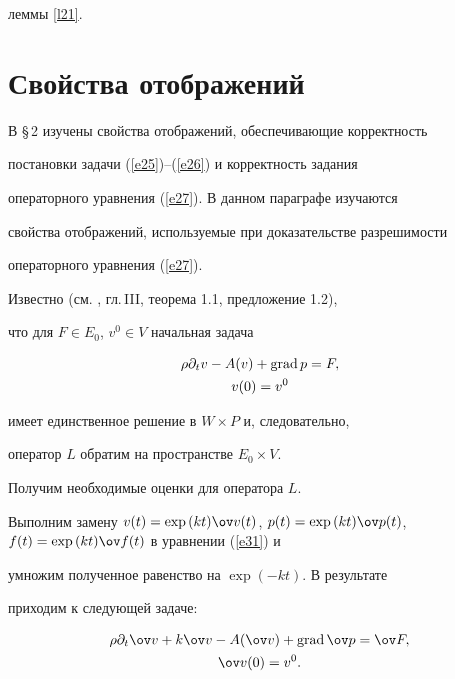 леммы \ref{l21}.








\section{Свойства отображений}





В \S\,2 изучены свойства отображений, обеспечивающие корректность


постановки задачи (\ref{e25})--(\ref{e26}) и корректность задания


операторного уравнения (\ref{e27}). В данном параграфе изучаются


свойства отображений, используемые при доказательстве разрешимости


операторного уравнения (\ref{e27}).





Известно (см. \cite{Tem}, гл.\,III, теорема 1.1, предложение 1.2),


что для $F\in E_0$, $v^0\in V$ начальная задача


\begin{gather}\label{e31}


\rho \partial_t v-A(v)+\grad p=F, \\


v(0)=v^0\notag


\end{gather}


имеет единственное решение в $W\times P$ и, следовательно,


оператор $L$ обратим на пространстве $E_0 \times V$.





Получим необходимые оценки для оператора $L$.


Выполним замену $v(t)=\exp{(kt)}\ov v(t)$, $p(t)=\exp{(kt)}\ov


p(t)$, $f(t)=\exp{(kt)}\ov f(t)$ в уравнении (\ref{e31}) и


умножим полученное равенство на $\exp{(-kt)}$. В результате


приходим к следующей задаче:


\begin{gather}\label{e33}


\rho \partial_t \ov v+k \ov v-A(\ov v)+\grad \ov p=\ov F, \\


\label{e34} \ov v(0)=v^0.


\end{gather}






